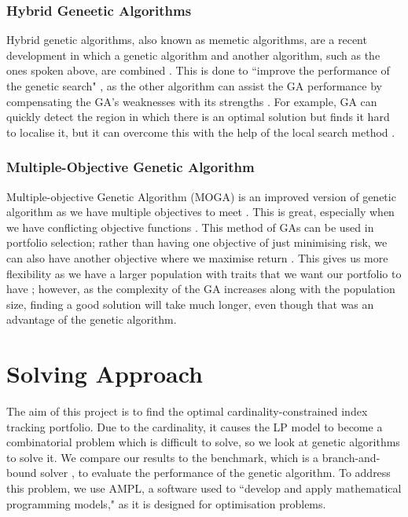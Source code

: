 \documentclass[12pt]{report}
\begin{document}
\subsection{Hybrid Geneetic Algorithms}
Hybrid genetic algorithms, also known as memetic algorithms, are a recent development in which a genetic algorithm and another algorithm, such as the ones spoken above, are combined \cite{zanjirdar2020overview}. This is done to ``improve the performance of the genetic search" \cite{el2006hybrid}, as the other algorithm can assist the GA performance by compensating the GA's weaknesses with its strengths \cite{el2006hybrid}. For example, GA can quickly detect the region in which there is an optimal solution but finds it hard to localise it, but it can overcome this with the help of the local search method \cite{el2006hybrid}.

\subsection{Multiple-Objective Genetic Algorithm}
Multiple-objective Genetic Algorithm (MOGA) is an improved version of genetic algorithm as we have multiple objectives to meet \cite{murata1995moga}. This is great, especially when we have conflicting objective functions \cite{murata1995moga}. This method of GAs can be used in portfolio selection; rather than having one objective of just minimising risk, we can also have another objective where we maximise return \cite{bermudez2012multi}. This gives us more flexibility as we have a larger population with traits that we want our portfolio to have \cite{bermudez2012multi}; however, as the complexity of the GA increases along with the population size, finding a good solution will take much longer, even though that was an advantage of the genetic algorithm.

\chapter{Solving Approach}

The aim of this project is to find the optimal cardinality-constrained index tracking portfolio. Due to the cardinality, it causes the LP model to become a combinatorial problem which is difficult to solve, so we look at genetic algorithms to solve it. We compare our results to the benchmark, which is a branch-and-bound solver \cite{IBMsolver,amplsolver}, to evaluate the performance of the genetic algorithm. To address this problem, we use AMPL, a software used to ``develop and apply mathematical programming models," \cite{ampl} as it is designed for optimisation problems.
\end{document}
